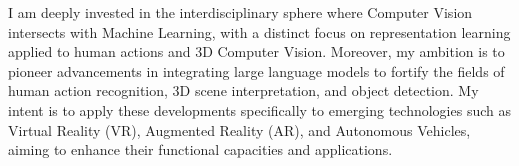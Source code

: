 


\begin{cventries}

\cvtext
{ %
\begin{cvitems}
    I am deeply invested in the interdisciplinary sphere where Computer Vision intersects with Machine Learning, with a distinct focus on representation learning applied to human actions and 3D Computer Vision. 
    Moreover, my ambition is to pioneer advancements in integrating large language models to fortify the fields of human action recognition, 3D scene interpretation, and object detection. My intent is to apply these developments specifically to emerging technologies such as Virtual Reality (VR), Augmented Reality (AR), and Autonomous Vehicles, aiming to enhance their functional capacities and applications.
\end{cvitems}
}


\end{cventries}
